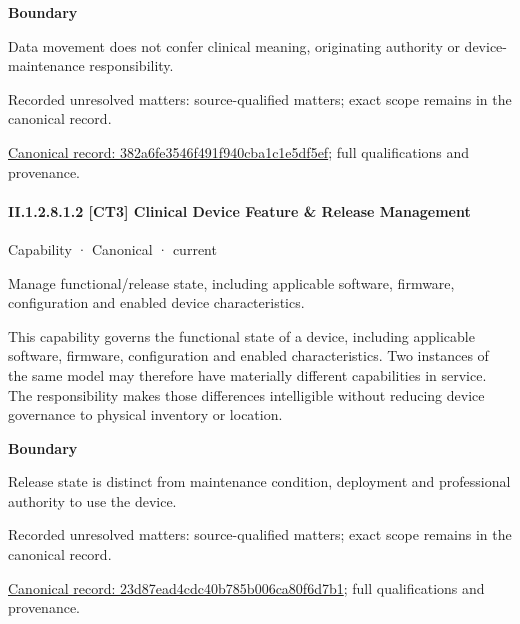 \textbf{Boundary}



Data movement does not confer clinical meaning, originating authority or device-maintenance responsibility.


{\small Recorded unresolved matters: source-qualified matters; exact scope remains in the canonical record.}\par
{\footnotesize \href{../../../../../../../continuum/strategy/capability/382a6fe3546f491f940cba1c1e5df5ef.md}{Canonical record: 382a6fe3546f491f940cba1c1e5df5ef}; full qualifications and provenance.}\par
\paragraph*{II.1.2.8.1.2 [CT3] Clinical Device Feature \& Release Management}
\label{navigation:II.1.2.8.1.2}

\label{element:23d87ead4cdc40b785b006ca80f6d7b1}
{\small Capability · Canonical · current}\par

Manage functional/release state, including applicable software, firmware, configuration and enabled device characteristics.



This capability governs the functional state of a device, including applicable software, firmware, configuration and enabled characteristics. Two instances of the same model may therefore have materially different capabilities in service. The responsibility makes those differences intelligible without reducing device governance to physical inventory or location.



\textbf{Boundary}



Release state is distinct from maintenance condition, deployment and professional authority to use the device.


{\small Recorded unresolved matters: source-qualified matters; exact scope remains in the canonical record.}\par
{\footnotesize \href{../../../../../../../continuum/strategy/capability/23d87ead4cdc40b785b006ca80f6d7b1.md}{Canonical record: 23d87ead4cdc40b785b006ca80f6d7b1}; full qualifications and provenance.}\par
